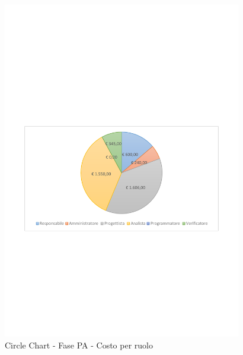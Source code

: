 \documentclass[../PianoProgetto.tex]{subfiles}
\begin{document}
	\begin{figure}[!h]
		\centering
		\includegraphics[width=0.93\textwidth , trim=2cm 9.5cm 2cm 11cm]{grafici/PA/PA-costo}
			\caption{Circle Chart - Fase PA - Costo per ruolo}
		\label{fig:CircleChart-fasePA_costo}
	\end{figure}
\vfill	
\newpage
\vfill
\end{document}
